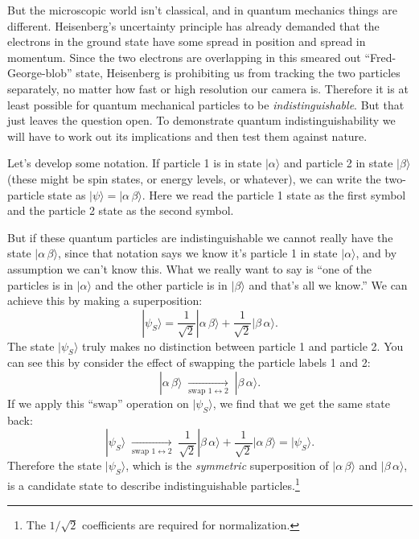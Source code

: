 But the microscopic world isn't classical, and in quantum mechanics
things are different.  Heisenberg's uncertainty principle has already
demanded that the electrons in the ground state have some spread in
position and spread in momentum.  Since the two electrons are
overlapping in this smeared out ``Fred-George-blob'' state, Heisenberg
is prohibiting us from tracking the two particles separately, no
matter how fast or high resolution our camera is.  Therefore it is at
least possible for quantum mechanical particles to be
\textit{indistinguishable}.  But that just leaves the question open.
To demonstrate quantum indistinguishability we will have to work out
its implications and then test them against nature.

Let's develop some notation.  If particle 1 is in state
$|\alpha\rangle$ and particle 2 in state $|\beta\rangle$ (these might
be spin states, or energy levels, or whatever), we can write the
two-particle state as $|\psi\rangle = |\alpha\,\beta\rangle$.  Here we
read the particle 1 state as the first symbol and the particle 2 state
as the second symbol.

But if these quantum particles are indistinguishable we cannot really
have the state $|\alpha\,\beta\rangle$, since that notation says we
know it's particle 1 in state $|\alpha\rangle$, and by assumption we
can't know this.  What we really want to say is ``one of the particles
is in $|\alpha\rangle$ and the other particle is in $|\beta\rangle$
and that's all we know.''  We can achieve this by making a
superposition:
\begin{equation}
  |\psi_S\rangle = \frac{1}{\sqrt 2} |\alpha\,\beta\rangle +
  \frac{1}{\sqrt 2}|\beta\,\alpha\rangle.
\end{equation}
The state $|\psi_S\rangle$ truly makes no distinction between particle
1 and particle 2.  You can see this by consider the effect of swapping
the particle labels 1 and 2:
\begin{equation}
  |\alpha\,\beta\rangle 
  \;\xrightarrow[\text{swap } 1\leftrightarrow 2]{} \; 
  |\beta\,\alpha\rangle.
\label{eq:swap_operation}
\end{equation}
If we apply this ``swap'' operation on $|\psi_S\rangle$, we find that
we get the same state back:
\begin{equation}
  |\psi_S\rangle \; \xrightarrow[\text{swap } 1\leftrightarrow 2]{} \;
  \frac{1}{\sqrt 2} |\beta\,\alpha\rangle + \frac{1}{\sqrt 2}
  |\alpha\,\beta\rangle = |\psi_S\rangle.
\end{equation}
Therefore the state $|\psi_S\rangle$, which is the \textit{symmetric}
superposition of $|\alpha\,\beta\rangle$ and $|\beta\,\alpha\rangle$,
is a candidate state to describe indistinguishable
particles.\footnote{The $1/\sqrt{2}$ coefficients are required for
  normalization.}

